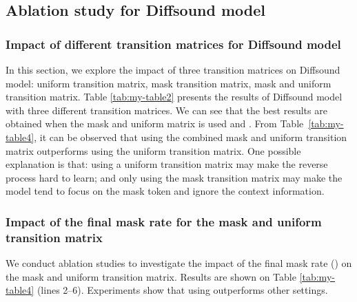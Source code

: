 \documentclass[lettersize,journal]{IEEEtran}
\begin{document}
\subsection{Ablation study for Diffsound model}
\subsubsection{Impact of different transition matrices for Diffsound model}
In this section, we explore the impact of three transition matrices on Diffsound model: uniform transition matrix, mask transition matrix, mask and uniform transition matrix. Table \ref{tab:my-table2} presents the results of Diffsound model with three different transition matrices. We can see that the best results are obtained when the mask and uniform matrix is used and . 
{\color{black}From Table~\ref{tab:my-table4}, it can be observed that using the combined mask and uniform transition matrix outperforms using the uniform transition matrix. One possible explanation is that: using a uniform transition matrix may make the reverse process hard to learn; and only using the mask transition matrix may make the model tend to focus on the mask token and ignore the context information.}
\subsubsection{Impact of the final mask rate  for the mask and uniform transition matrix} We conduct ablation studies to investigate the impact of the final mask rate () on the mask and uniform transition matrix. {\color{black}Results are shown on Table \ref{tab:my-table4} (lines 2–6). Experiments show that using  outperforms other settings}. 
\end{document}
